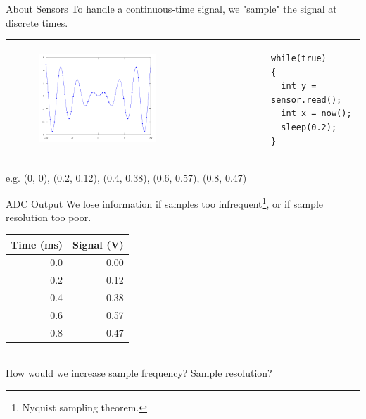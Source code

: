 \documentclass{beamer}
\begin{document}
\begin{frame}[fragile]{About Sensors}
\small To handle a continuous-time signal, we "sample" the signal at discrete times.	\\
\vspace{0.5em}
\begin{tabular}{@{}m{} m{}@{}}
\begin{figure}
\centering
\includegraphics[width=0.6\textwidth,height=0.6\textheight,keepaspectratio]{img/sine-points.png}
\end{figure}
&
\begin{Verbatim}[fontsize=\scriptsize]
while(true)
{
  int y = sensor.read();
  int x = now();
  sleep(0.2);
}		
\end{Verbatim}	
\end{tabular}
\vspace{0.5em}
e.g. (0, 0), (0.2, 0.12), (0.4, 0.38), (0.6, 0.57), (0.8, 0.47)	\\	
\end{frame}
  
\begin{frame}{ADC Output}
We lose information if samples too infrequent\footnote{Nyquist sampling theorem.}, or if sample resolution too poor.
\begin{center}
\begin{tabular}{r|r}
Time (ms) & Signal (V) \\ \hline
0.0 & 0.00 \\
0.2 & 0.12 \\
0.4 & 0.38 \\
0.6 & 0.57 \\
0.8 & 0.47 \\
\end{tabular}
\end{center}
~\\[1em]
How would we increase sample frequency? Sample resolution?
\end{frame}  
 
\end{document}
